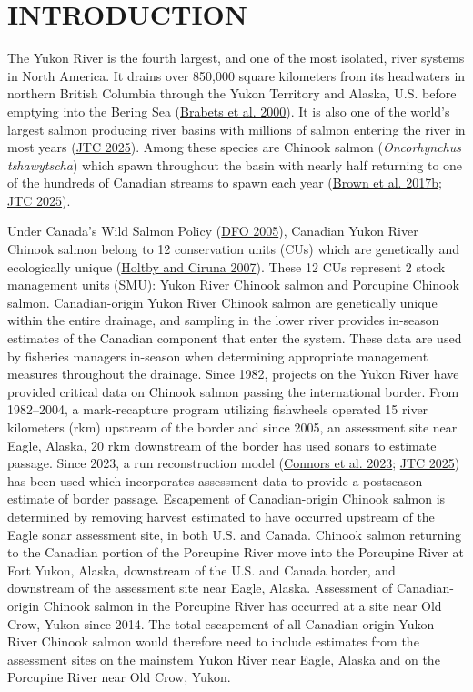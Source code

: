 \documentclass[11pt]{book}
\begin{document}
\frontmatter

\hypertarget{sec:introduction}{%
\section{INTRODUCTION}\label{sec:introduction}}

The Yukon River is the fourth largest, and one of the most isolated, river systems in North America. It drains over 850,000 square kilometers from its headwaters in northern British Columbia through the Yukon Territory and Alaska, U.S. before emptying into the Bering Sea (\protect\hyperlink{ref-brabets2000environmental}{Brabets et al. 2000}). It is also one of the world's largest salmon producing river basins with millions of salmon entering the river in most years (\protect\hyperlink{ref-JTC2025Report}{JTC 2025}). Among these species are Chinook salmon (\emph{Oncorhynchus tshawytscha}) which spawn throughout the basin with nearly half returning to one of the hundreds of Canadian streams to spawn each year (\protect\hyperlink{ref-brown2017}{Brown et al. 2017b}; \protect\hyperlink{ref-JTC2025Report}{JTC 2025}).

Under Canada's Wild Salmon Policy (\protect\hyperlink{ref-WSP2005}{DFO 2005}), Canadian Yukon River Chinook salmon belong to 12 conservation units (CUs) which are genetically and ecologically unique (\protect\hyperlink{ref-holtbyConservationUnitsPacific2007}{Holtby and Ciruna 2007}). These 12 CUs represent 2 stock management units (SMU): Yukon River Chinook salmon and Porcupine Chinook salmon. Canadian-origin Yukon River Chinook salmon are genetically unique within the entire drainage, and sampling in the lower river provides in-season estimates of the Canadian component that enter the system. These data are used by fisheries managers in-season when determining appropriate management measures throughout the drainage. Since 1982, projects on the Yukon River have provided critical data on Chinook salmon passing the international border. From 1982--2004, a mark-recapture program utilizing fishwheels operated 15 river kilometers (rkm) upstream of the border and since 2005, an assessment site near Eagle, Alaska, 20 rkm downstream of the border has used sonars to estimate passage. Since 2023, a run reconstruction model (\protect\hyperlink{ref-connors_estimates_2023}{Connors et al. 2023}; \protect\hyperlink{ref-JTC2025Report}{JTC 2025}) has been used which incorporates assessment data to provide a postseason estimate of border passage. Escapement of Canadian-origin Chinook salmon is determined by removing harvest estimated to have occurred upstream of the Eagle sonar assessment site, in both U.S. and Canada. Chinook salmon returning to the Canadian portion of the Porcupine River move into the Porcupine River at Fort Yukon, Alaska, downstream of the U.S. and Canada border, and downstream of the assessment site near Eagle, Alaska. Assessment of Canadian-origin Chinook salmon in the Porcupine River has occurred at a site near Old Crow, Yukon since 2014. The total escapement of all Canadian-origin Yukon River Chinook salmon would therefore need to include estimates from the assessment sites on the mainstem Yukon River near Eagle, Alaska and on the Porcupine River near Old Crow, Yukon.
\end{document}
